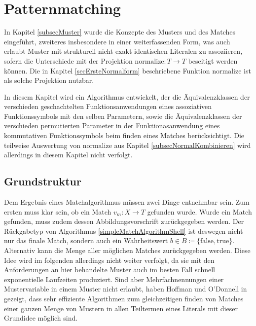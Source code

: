 

\section{Patternmatching} \label{secPattermatching}

In Kapitel \ref{subsecMuster} wurde die Konzepte des Musters und des Matches eingeführt, zweiteres insbesondere in einer weiterfassenden Form, was auch erlaubt Muster mit strukturell nicht exakt identischen Literalen zu assoziieren, sofern die Unterschiede mit der Projektion $\mathrm{normalize} \colon T \rightarrow T$ beseitigt werden können. Die in Kapitel \ref{secErsteNormalform} beschriebene Funktion $\mathrm{normalize}$ ist als solche Projektion nutzbar.  

In diesem Kapitel wird ein Algorithmus entwickelt, der die Äquivalenzklassen der verschieden geschachtelten Funktionsanwendungen eines assoziativen Funktionssymbols mit den selben Parametern, sowie die Äquivalenzklassen der verschieden permutierten Parameter in der Funktionasanwendung eines kommutativen Funktionssymbols beim finden eines Matches berücksichtigt. Die teilweise Auswertung von $\mathrm{normalize}$ aus Kapitel \ref{subsecNormalKombinieren} wird allerdings in diesem Kapitel nicht verfolgt.

\subsection{Grundstruktur} \label{subsecPatternmatchingGrundstruktur}


Dem Ergebnis eines Matchalgorithmus müssen zwei Dinge entnehmbar sein. Zum ersten muss klar sein, ob ein Match $v_m \colon X \rightarrow T$ gefunden wurde. Wurde ein Match gefunden, muss zudem dessen Abbildungsvorschrift zurückgegeben werden. Der Rückgabetyp von Algorithmus \ref{simpleMatchAlgorithmShell} ist deswegen nicht nur das finale Match, sondern auch ein Wahrheitswert $b \in B \coloneqq \{\mathrm{false}, \mathrm{true}\}$. Alternativ kann die Menge aller möglichen Matches zurückgegeben werden. Diese Idee wird im folgenden allerdings nicht weiter verfolgt, da sie mit den Anforderungen an hier behandelte Muster auch im besten Fall schnell exponentielle Laufzeiten produziert. Sind aber Mehrfachnennungen einer Mustervariable in einem Muster nicht erlaubt, haben Hoffman und O'Donnell in \cite{patternMatchingInTrees} gezeigt, dass sehr effiziente Algorithmen zum gleichzeitigen finden von Matches einer ganzen Menge von Mustern in allen Teiltermen eines Literals mit dieser Grundidee möglich sind.\\

